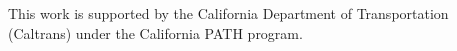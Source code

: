 This work is supported by the California Department of Transportation (Caltrans) under the California PATH program.